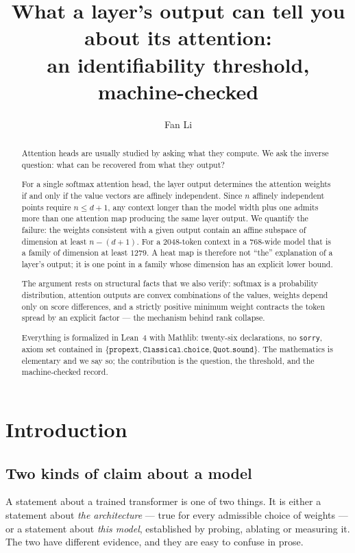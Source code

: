 \documentclass[11pt]{article}
\title{What a layer's output can tell you about its attention:\\
an identifiability threshold, machine-checked}
\author{Fan Li}
\date{}
\newcommand{\Lean}{Lean}
\newcommand{\code}[1]{\texttt{#1}}
\begin{document}
\maketitle

\begin{abstract}
Attention heads are usually studied by asking what they compute. We ask the
inverse question: what can be recovered from what they output?

For a single softmax attention head, the layer output determines the attention
weights if and only if the value vectors are affinely independent. Since $n$
affinely independent points require $n \le d+1$, any context longer than the
model width plus one admits more than one attention map producing the same
layer output. We quantify the failure: the weights consistent with a given
output contain an affine subspace of dimension at least $n-(d+1)$. For a
2048-token context in a 768-wide model that is a family of dimension at least
$1279$. A heat map is therefore not ``the'' explanation of a layer's output; it
is one point in a family whose dimension has an explicit lower bound.

The argument rests on structural facts that we also verify: softmax is a
probability distribution, attention outputs are convex combinations of the
values, weights depend only on score differences, and a strictly positive
minimum weight contracts the token spread by an explicit factor --- the
mechanism behind rank collapse.

Everything is formalized in \Lean{}~4 with Mathlib: twenty-six declarations,
no \code{sorry}, axiom set contained in $\{\code{propext},
\code{Classical.choice}, \code{Quot.sound}\}$. The mathematics is elementary
and we say so; the contribution is the question, the threshold, and the
machine-checked record.

\end{abstract}

\tableofcontents

\section{Introduction}

\subsection{Two kinds of claim about a model}

A statement about a trained transformer is one of two things. It is either a
statement about \emph{the architecture} --- true for every admissible choice of
weights --- or a statement about \emph{this model}, established by probing,
ablating or measuring it. The two have different evidence, and they are easy to
confuse in prose.
\end{document}
